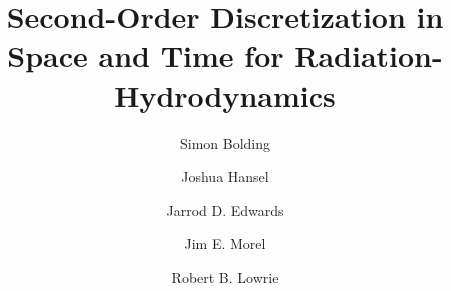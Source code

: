 \documentclass[preprint,12pt]{elsarticle}
\begin{document}
\begin{frontmatter}



\title{Second-Order Discretization in Space and Time for Radiation-Hydrodynamics}


\author[tamu_address]{Simon Bolding}
\author[tamu_address]{Joshua Hansel}
\author[sandia_address]{Jarrod D. Edwards}
\author[tamu_address]{Jim E. Morel}
\author[lanl_address]{Robert B. Lowrie}


\address[tamu_address]{Department of Nuclear Engineering, 337 Zachry Engineering Center, TAMU 3133, Texas A\&M University, College Station, Texas, 77843}
\address[sandia_address]{Phenomenology and Sensor Science Department, Sandia National Laboratory, Albuquerque, NM}
\address[lanl_address]{Computational Physics Group CCS-2, Los Alamos National Laboratory, P.O. Box 1663, MS D413, Los Alamos, NM 87545}
\begin{abstract}


\end{abstract}
\end{frontmatter}
\end{document}
